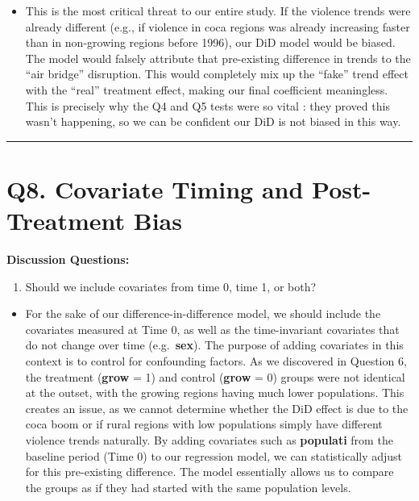 \documentclass[
]{article}
\providecommand{\tightlist}{%
  \setlength{\itemsep}{0pt}\setlength{\parskip}{0pt}}
\begin{document}
\begin{itemize}
\tightlist
\item
  This is the most critical threat to our entire study. If the violence
  trends were already different (e.g., if violence in coca regions was
  already increasing faster than in non-growing regions before 1996),
  our DiD model would be biased. The model would falsely attribute that
  pre-existing difference in trends to the ``air bridge'' disruption.
  This would completely mix up the ``fake'' trend effect with the
  ``real'' treatment effect, making our final coefficient meaningless.
  This is precisely why the Q4 and Q5 tests were so vital : they proved
  this wasn't happening, so we can be confident our DiD is not biased in
  this way.
\end{itemize}

\begin{center}\rule{0.5\linewidth}{0.5pt}\end{center}

\section{Q8. Covariate Timing and Post-Treatment
Bias}\label{q8.-covariate-timing-and-post-treatment-bias}

\textbf{Discussion Questions:}

\begin{enumerate}
\def\labelenumi{\arabic{enumi}.}
\tightlist
\item
  Should we include covariates from time 0, time 1, or both?
\end{enumerate}

\begin{itemize}
\tightlist
\item
  For the sake of our difference-in-difference model, we should include
  the covariates measured at Time 0, as well as the time-invariant
  covariates that do not change over time (e.g.~\textbf{sex}). The
  purpose of adding covariates in this context is to control for
  confounding factors. As we discovered in Question 6, the treatment
  (\textbf{grow} = 1) and control (\textbf{grow} = 0) groups were not
  identical at the outset, with the growing regions having much lower
  populations. This creates an issue, as we cannot determine whether the
  DiD effect is due to the coca boom or if rural regions with low
  populations simply have different violence trends naturally. By adding
  covariates such as \textbf{populati} from the baseline period (Time 0)
  to our regression model, we can statistically adjust for this
  pre-existing difference. The model essentially allows us to compare
  the groups as if they had started with the same population levels.
\end{itemize}
\end{document}
